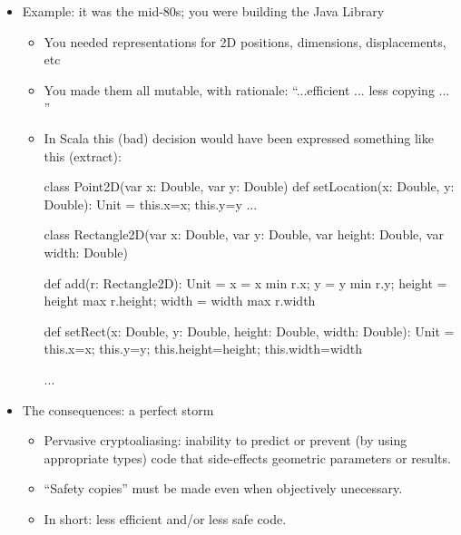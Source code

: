\documentclass{ip3}
\begin{document}
\begin{foil}
\begin{itemize}
\item Example: it was the mid-80s; you were building the Java Library 
\begin{itemize}
\item You needed representations for 2D positions, dimensions, displacements, etc 
\item You made them all mutable, with rationale: ``...efficient ... less copying ... ''
\item In Scala this (bad) decision would have been expressed something like this (extract):
\begin{-scala}

 class Point2D(var x: Double, var y: Double) 
 { def setLocation(x: Double, y: Double): Unit = { this.x=x; this.y=y }
   ...
 }
 
 class Rectangle2D(var x: Double, var y: Double, var height: Double, var width: Double)
 { def add(r: Rectangle2D): Unit = 
       { x = x min r.x; y = y min r.y; height = height max r.height; width = width max r.width }          
       
   def setRect(x: Double, y: Double, height: Double, width: Double): Unit =
       { this.x=x; this.y=y; this.height=height; this.width=width }   
              
   ...        
 }
\end{-scala} 
\end{itemize}
\end{itemize}
\end{foil}


\begin{foil}
\begin{itemize}
\item The consequences: a perfect storm
\begin{itemize}
      \item Pervasive cryptoaliasing: inability to predict or prevent (by using appropriate types) code that
      side-effects geometric parameters or results. 
      \item ``Safety copies'' must be made even when  objectively unecessary. 
      \item In short: less efficient and/or less safe code.
\end{itemize}
\end{itemize} 
\end{foil}
\end{document}

